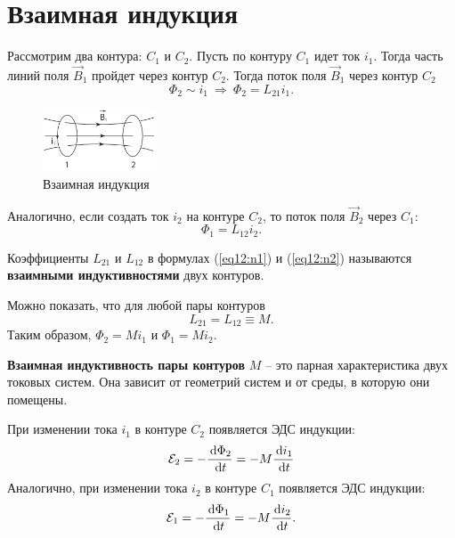 \section{Взаимная индукция}
    Рассмотрим два контура: \( C_1 \) и \( C_2 \). Пусть по контуру \( C_1 \)
    идет ток \( i_1 \). Тогда часть линий поля \( \vec{B}_1 \) пройдет через
    контур \( C_2 \). Тогда поток поля \( \vec{B}_1 \) через контур \( C_2 \)
    \begin{equation}
        \Phi_2 \sim i_1 \  \Rightarrow \  \Phi_2 = L_{21}i_1.
        \label{eq12:n1}
    \end{equation}

    \begin{figure}[b!]
        \center
        \includegraphics[width=0.3\textwidth]{lec12/mutual_inductance.pdf}
        \caption{Взаимная индукция}
    \end{figure}

    Аналогично, если создать ток \( i_2 \) на контуре \( C_2 \), то поток поля 
    \( \vec{B}_2 \) через \( C_1 \):
    \begin{equation}
        \Phi_1 = L_{12}i_2.
        \label{eq12:n2}
    \end{equation}
    
    \begin{definition}
        Коэффициенты \( L_{21} \) и \( L_{12} \) в формулах (\ref{eq12:n1}) и
        (\ref{eq12:n2}) называются \textbf{взаимными индуктивностями} двух
        контуров.
    \end{definition}
    
    Можно показать, что для любой пары контуров
    \[
        L_{21} = L_{12} \equiv M.
    \]
    Таким образом, \( \Phi_2 = Mi_1\) и \( \Phi_1 = Mi_2 \).
    
    \begin{definition}
        \textbf{Взаимная индуктивность пары контуров} \( M \) -- это парная
        характеристика двух токовых систем. Она зависит от геометрий систем и
        от среды, в которую они помещены.
    \end{definition}
    
    При изменении тока \( i_1 \) в контуре \( C_2 \) появляется ЭДС индукции:
    \begin{equation}
        \mathcal{E}_2 = -\frac{\,\mathrm{d} \Phi_2}{\,\mathrm{d} t} = -M\frac{\,\mathrm{d} i_1}{\,\mathrm{d} t}
        \label{eq12:n3}
    \end{equation}
    Аналогично, при изменении тока \( i_2 \) в контуре \( C_1 \) появляется ЭДС
    индукции:
    \[
        \mathcal{E}_1 = -\frac{\,\mathrm{d} \Phi_1}{\,\mathrm{d} t} = -M\frac{\,\mathrm{d} i_2}{\,\mathrm{d} t}.
    \]
    
